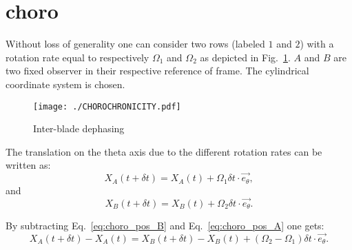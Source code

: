 \section{choro} %
\label{sec:choro}

Without loss of generality one can
consider two rows (labeled $1$ and $2$) with a 
rotation rate equal to respectively $\Omega_1$ and $\Omega_2$ as
depicted in Fig.~\ref{fig:chorochronicity}.
$A$ and $B$ are two fixed observer in their respective reference
of frame. The cylindrical coordinate system is chosen.

\begin{figure}[htbp]
  \centering
  \texttt{[image: ./CHOROCHRONICITY.pdf]}
  \caption{Inter-blade dephasing}
  \label{fig:chorochronicity}
\end{figure}

The translation on the theta axis due to the different rotation rates can be 
written as:
\begin{equation}
    X_A (t + \delta t) = X_A (t) +  \Omega_1 \delta t \cdot \vec{e_\theta},
    \label{eq:choro_pos_A}
\end{equation}
and
\begin{equation}
    X_B (t + \delta t) = X_B (t) +  \Omega_2 \delta t \cdot \vec{e_\theta}.
    \label{eq:choro_pos_B}
\end{equation}

By subtracting Eq.~\eqref{eq:choro_pos_B} and Eq.~\eqref{eq:choro_pos_A}
one gets:
\begin{equation}
    X_A (t + \delta t) - X_A (t) = X_B (t + \delta t) - X_B (t) + (\Omega_2 - \Omega_1) \delta t \cdot \vec{e_\theta}.
\end{equation}




